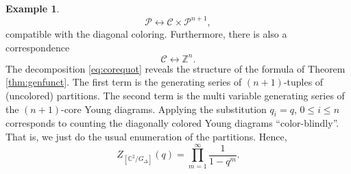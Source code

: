 \documentclass[11pt,a4paper]{amsart}
\newtheorem{corollary}[theorem]{Corollary}
\theoremstyle{definition}
\newtheorem{example}[theorem]{Example}
\newcommand{\SZ}{\mathbb{Z}}                    %
\newcommand{\SC}{\mathbb{C}}                    %
\begin{document}
\begin{example}
	\begin{equation}\label{eq:corequot} {\mathcal P} \longleftrightarrow {\mathcal C} \times {\mathcal P}^{n+1}, \end{equation}
	compatible with the diagonal coloring. Furthermore, there is also a correspondence
	\begin{equation*}\label{typeA-cores} 
	{\mathcal C} \longleftrightarrow \SZ^{n}. \end{equation*}
	The decomposition \eqref{eq:corequot} reveals the structure of the
	formula of Theorem \ref{thm:genfunct}. The first term is the generating series of $(n+1)$-tuples of 
	(uncolored) partitions. The second term is the multi variable generating series of the $(n+1)$-core Young diagrams. Applying the substitution $q_i=q$, $0 \leq i \leq n$ corresponds to counting the diagonally colored Young diagrams ``color-blindly''. That is, we just do the usual enumeration of the partitions. Hence,
	\[ Z_{[\SC^2/G_\Delta]}(q)=\prod_{m=1}^{\infty}\frac{1}{1-q^m}.\]
\end{example}


\end{document}
